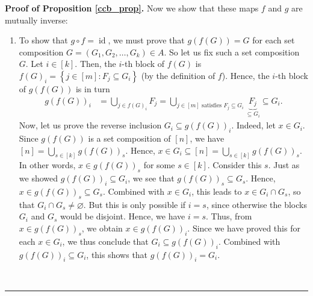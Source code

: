 \documentclass[12pt]{article}
\theoremstyle{definition}%
\theoremstyle{definition}%
\theoremstyle{remark}%
\newcommand{\tup}[1]{\left( #1 \right)}
\newcommand{\interval}[1]{\left[ #1 \right]} %
\newcommand{\set}[1]{\left\{ #1 \right\}}
\newcommand{\id}{\operatorname{id}}
\newenvironment{proof}[1][Proof]{\noindent\textbf{#1.} }{\ \rule{0.5em}{0.5em}}
\begin{document}
\begin{proof}[Proof of Proposition \ref{ccb_prop}]
	Now we show that these maps $f$ and $g$ are mutually inverse:
	\begin{enumerate}
	\item To show that $g \circ f = \id$, we must prove that $g\tup{f\tup{G}} = G$ for each set composition $G = \tup{G_1, G_2, \ldots, G_k} \in A$. So let us fix such a set composition $G$. %
	Let $i \in \interval{k}$.
	Then, the $i$-th block of $f\tup{G}$ is $f\tup{G}_i = \set{j \in \interval{m} : F_{j} \subseteq G_i}$ (by the definition of $f$).
	Hence, the $i$-th block of $g\tup{f\tup{G}}$ is in turn
    \begin{align*}
    g\tup{f\tup{G}}_i &= \bigcup_{j \in f\tup{G}_i} F_{j} = \bigcup_{j \in \interval{m} \text{ satisfies } F_{j} \subseteq G_i} \underbrace{F_{j}}_{\subseteq G_i} \subseteq G_i.
    \end{align*}
	Now, let us prove the reverse inclusion $G_i \subseteq g\tup{f\tup{G}}_i$.
	Indeed, let $x \in G_i$.
	Since $g\tup{f\tup{G}}$ is a set composition of $\interval{n}$, we have $\interval{n} = \bigcup_{s \in \interval{k}} g\tup{f\tup{G}}_{s}$.
	Hence, $x \in G_i \subseteq \interval{n} = \bigcup_{s \in \interval{k}} g\tup{f\tup{G}}_{s}$.
	In other words, $x \in g\tup{f\tup{G}}_{s}$ for some $s \in \interval{k}$.
	Consider this $s$.
	Just as we showed $g\tup{f\tup{G}}_i \subseteq G_i$, we see that $g\tup{f\tup{G}}_{s} \subseteq G_{s}$.
	Hence, $x \in g\tup{f\tup{G}}_{s} \subseteq G_{s}$.
	Combined with $x \in G_i$, this leads to $x \in G_i \cap G_{s}$, so that $G_i \cap G_s \neq \varnothing$.
	But this is only possible if $i = s$, since otherwise the blocks $G_i$ and $G_{s}$ would be disjoint.
	Hence, we have $i = s$. Thus, from $x \in g\tup{f\tup{G}}_{s}$, we obtain $x \in g\tup{f\tup{G}}_i$.
	Since we have proved this for each $x \in G_i$, we thus conclude that $G_i \subseteq g\tup{f\tup{G}}_i$. Combined with $g\tup{f\tup{G}}_i \subseteq G_i$, this shows that $g\tup{f\tup{G}}_i = G_i$.
	

\end{enumerate}
\end{proof}
\end{document}
